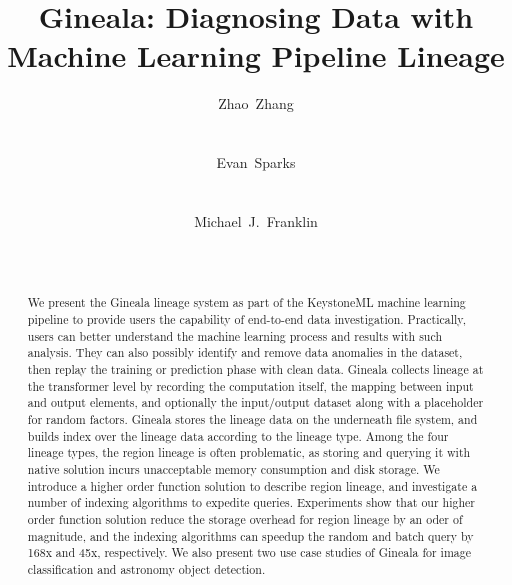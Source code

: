 \documentclass{sig-alternate}
\begin{document}
\title{Gineala: Diagnosing Data with Machine Learning Pipeline Lineage}

\author{
\alignauthor Zhao~Zhang\\\
       \\
        \\
\alignauthor Evan~Sparks\\\
       \\
       \\
\alignauthor Michael~J.~Franklin\\
       \\
       \\
}

\maketitle

\begin{abstract}
We present the Gineala lineage system as part of the KeystoneML machine learning pipeline to provide
users the capability of end-to-end data investigation. 
Practically, users can better understand the machine learning process and results with such analysis.
They can also possibly identify and remove data anomalies in the dataset, then replay the training or
prediction phase with clean data.
Gineala collects lineage at the transformer level by recording the computation itself, the mapping
between input and output elements, and optionally the input/output dataset along with a placeholder
for random factors. 
Gineala stores the lineage data on the underneath file system, and builds index over the lineage data
according to the lineage type. 
Among the four lineage types, the region lineage is often problematic, as storing and querying it with
native solution incurs unacceptable memory consumption and disk storage. 
We introduce a higher order function solution to describe region lineage, and investigate a number of indexing
algorithms to expedite queries. 
Experiments show that our higher order function solution reduce the storage overhead for region lineage 
by an oder of magnitude, and the indexing algorithms can speedup the random and batch query by 168x and 45x,
respectively.
We also present two use case studies of Gineala for image classification and astronomy object detection.
\end{abstract}
\end{document}
